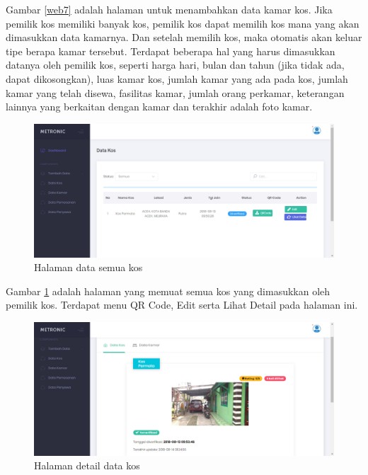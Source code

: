 \begin{enumerate}[a.]
		Gambar \ref{web7} adalah halaman untuk menambahkan data kamar kos. Jika pemilik kos memiliki banyak kos, pemilik kos dapat memilih kos mana yang akan dimasukkan data kamarnya. Dan setelah memilih kos, maka otomatis akan keluar tipe berapa kamar tersebut. Terdapat beberapa hal yang harus dimasukkan datanya oleh pemilik kos, seperti harga hari, bulan dan tahun (jika tidak ada, dapat dikosongkan),  luas kamar kos, jumlah kamar yang ada pada kos, jumlah kamar yang telah disewa, fasilitas kamar, jumlah orang perkamar, keterangan lainnya yang berkaitan dengan kamar dan terakhir adalah foto kamar.
	
		\begin{figure}[H]
			\centering
			\includegraphics[width=\textwidth]{gambar/web/9}
			\caption{Halaman data semua kos}
			\label{web9}
		\end{figure}
		
		Gambar \ref{web9} adalah halaman yang memuat semua kos yang dimasukkan oleh pemilik kos. Terdapat menu QR Code, Edit serta Lihat Detail pada halaman ini.
		
	
		\begin{figure}[H]
			\centering
			\includegraphics[width=\textwidth]{gambar/web/17}
			\caption{Halaman detail data kos}
			\label{web17}
		\end{figure}
	

\end{enumerate}

